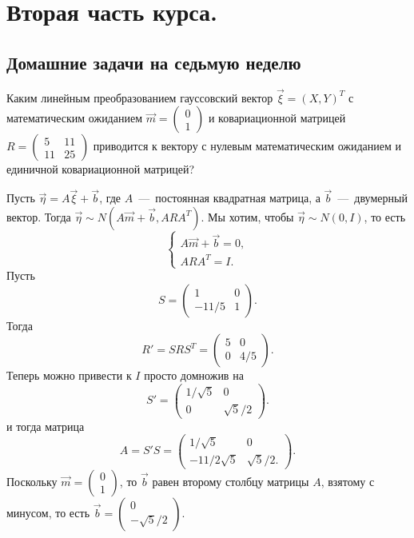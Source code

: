 \section{Вторая часть курса.}
\subsection{Домашние задачи на седьмую неделю}
\begin{problem}
    Каким линейным преобразованием гауссовский вектор $\vec{\xi} = (X, Y)^T$ с математическим ожиданием $\vec{m} = \begin{pmatrix*} 0 \\ 1
    \end{pmatrix*}$ и ковариационной матрицей
    $R = \begin{pmatrix*} 5 & 11 \\ 11 & 25
    \end{pmatrix*}$ приводится к вектору с нулевым математическим ожиданием и единичной ковариационной матрицей?
\end{problem}
\begin{solution}
    Пусть $\vec{\eta} = A\vec{\xi} + \vec{b}$, где $A$~---~постоянная квадратная матрица, а $\vec{b}$~---~двумерный вектор.
    Тогда $\vec{\eta} \sim N(A\vec{m} + \vec{b}, ARA^T)$.
    Мы хотим, чтобы $\vec{\eta} \sim N(0, I)$, то есть
    \begin{equation*}
        \begin{cases}
            A\vec{m} + \vec{b} = 0, \\
            ARA^T = I.
        \end{cases}
    \end{equation*}
    Пусть \[S = \begin{pmatrix*} 1 & 0 \\ -11/5 & 1
    \end{pmatrix*}.\] Тогда \[R' = SRS^T = \begin{pmatrix*} 5 & 0 \\ 0 & 4/5
    \end{pmatrix*}.\] Теперь можно привести к $I$ просто домножив на \[S' = \begin{pmatrix*} 1/\sqrt{5} & 0 \\ 0 & \sqrt{5}/2
    \end{pmatrix*}.\] и тогда матрица \[A = S'S = \begin{pmatrix*} 1/\sqrt{5} & 0 \\ -11/2\sqrt{5} & \sqrt{5}/2.
    \end{pmatrix*}.\]
    Поскольку $\vec{m} = \begin{pmatrix*} 0 \\ 1
    \end{pmatrix*}$, то $\vec{b}$ равен второму столбцу матрицы $A$, взятому с минусом, то есть $\vec{b} = \begin{pmatrix*} 0 \\ -\sqrt{5}/2
    \end{pmatrix*}.$
\end{solution}

